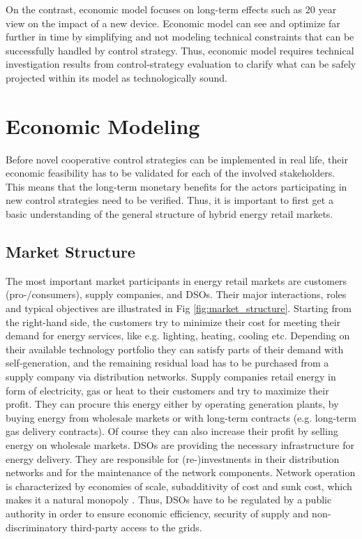 \documentclass[review]{elsarticle}
\begin{document}
On the contrast, economic model focuses on long-term effects such as
20 year view on the impact of a new device. 
Economic model can see and optimize far further in time by simplifying
and not modeling technical constraints that can be successfully
handled by control strategy. Thus, economic model requires technical
investigation results from control-strategy evaluation to clarify what
can be safely projected within its model as technologically sound.  

\section{Economic Modeling}
\label{sec:economy_model}
Before novel cooperative control strategies can be implemented in real 
life, their economic feasibility has to be validated for each of the
involved stakeholders. This means that the long-term monetary benefits
for the actors participating in new control strategies need to be
verified. Thus, it is important to first get a basic
understanding of the general structure of hybrid energy retail
markets.

\subsection{Market Structure}
\label{sec:econ-1}
\noindent
The most important market participants in energy retail markets are
customers (pro-/consumers), supply companies, and DSOs. Their
major interactions, roles and typical objectives are illustrated in
Fig  \ref{fig:market_structure}. 
Starting from the right-hand side, the customers try to minimize their
cost for meeting their demand for energy services, like e.g. lighting,
heating, cooling etc. Depending on their available technology
portfolio they can satisfy parts of their demand with self-generation,
and the remaining residual load has to be purchased from a supply
company via distribution networks. 
Supply companies retail energy in form of electricity, gas or heat to
their customers and try to maximize their profit. They can procure
this energy either by operating generation plants, by buying energy
from wholesale markets or with long-term contracts (e.g. long-term gas
delivery contracts). Of course they can also increase their profit by
selling energy on wholesale markets. 
DSOs are providing the necessary infrastructure for energy
delivery. They are responsible for (re-)investments in their
distribution networks and for the maintenance of the network
components. Network operation is characterized by economies of scale,
subadditivity of cost and sunk cost, which makes it a natural
monopoly \cite{auer_2011}. Thus, DSOs have to be regulated by a public
authority in order to ensure economic efficiency, security of supply
and non-discriminatory third-party access to the grids.  
\end{document}
